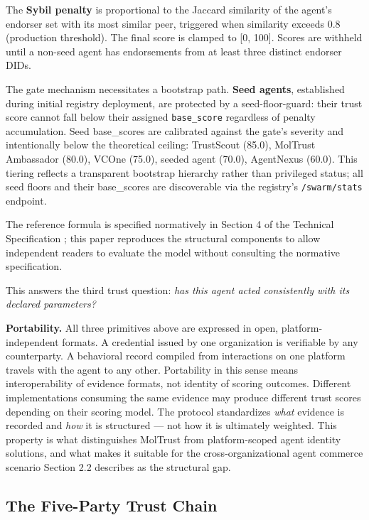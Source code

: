 The \textbf{Sybil penalty} is proportional to the Jaccard similarity of the agent's endorser set with its most similar peer, triggered when similarity exceeds 0.8 (production threshold). The final score is clamped to [0, 100]. Scores are withheld until a non-seed agent has endorsements from at least three distinct endorser DIDs.


The gate mechanism necessitates a bootstrap path. \textbf{Seed agents}, established during initial registry deployment, are protected by a seed-floor-guard: their trust score cannot fall below their assigned \texttt{base\_score} regardless of penalty accumulation. Seed base\_scores are calibrated against the gate's severity and intentionally below the theoretical ceiling: TrustScout (85.0), MolTrust Ambassador (80.0), VCOne (75.0), seeded agent (70.0), AgentNexus (60.0). This tiering reflects a transparent bootstrap hierarchy rather than privileged status; all seed floors and their base\_scores are discoverable via the registry's \texttt{/swarm/stats} endpoint.


The reference formula is specified normatively in Section 4 of the Technical Specification \cite{ref28_techspec}; this paper reproduces the structural components to allow independent readers to evaluate the model without consulting the normative specification.


This answers the third trust question: \textit{has this agent acted consistently with its declared parameters?}


\textbf{Portability.} All three primitives above are expressed in open, platform-independent formats. A credential issued by one organization is verifiable by any counterparty. A behavioral record compiled from interactions on one platform travels with the agent to any other. Portability in this sense means interoperability of evidence formats, not identity of scoring outcomes. Different implementations consuming the same evidence may produce different trust scores depending on their scoring model. The protocol standardizes \textit{what} evidence is recorded and \textit{how} it is structured — not how it is ultimately weighted. This property is what distinguishes MolTrust from platform-scoped agent identity solutions, and what makes it suitable for the cross-organizational agent commerce scenario Section 2.2 describes as the structural gap.


\subsection{The Five-Party Trust Chain}

